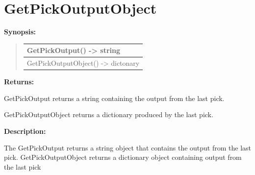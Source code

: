 \documentclass[letterpaper,10pt,english]{sphinxmanual}
\begin{document}
\section{GetPickOutputObject}
\label{functions:getpickoutputobject}
\begin{DUlineblock}{0em}
\item[] \textbf{Synopsis:}
\end{DUlineblock}
\begin{quote}

\begin{tabulary}{\linewidth}{|L|}
\hline

GetPickOutput() -\textgreater{} string
\\
\hline
GetPickOutputObject() -\textgreater{} dictonary
\\
\hline\end{tabulary}

\end{quote}

\begin{DUlineblock}{0em}
\item[] 
\item[] \textbf{Returns:}
\item[] GetPickOutput returns a string containing the output from the last pick.
\item[] GetPickOutputObject returns a dictionary produced by the last pick.
\item[] 
\item[] \textbf{Description:}
\item[] The GetPickOutput returns a string object that contains the output from
the last pick.
GetPickOutputObject returns a dictionary object containing output from the
last pick
\end{DUlineblock}

\begin{DUlineblock}{0em}
\item[] 
\end{DUlineblock}
\end{document}
